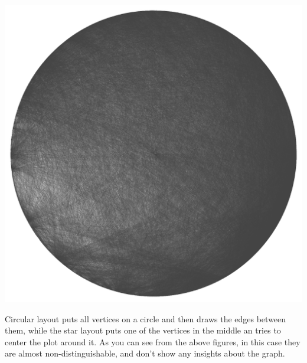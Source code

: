 \documentclass[12pt, a4paper]{article}
\begin{document}
\begin{multicols}{2}
{\includegraphics[width=\columnwidth]{src/youtube/hdg/comp/2_plot_str}\\
\label{fig:hdg_c2}}
\end{multicols}

Circular layout puts all vertices on a circle and then draws the edges between them, while the star layout puts one of the vertices in the middle an tries to center the plot around it. As you can see from the above figures, in this case they are almost non-distinguishable, and don't show any insights about the graph.
\end{document}
